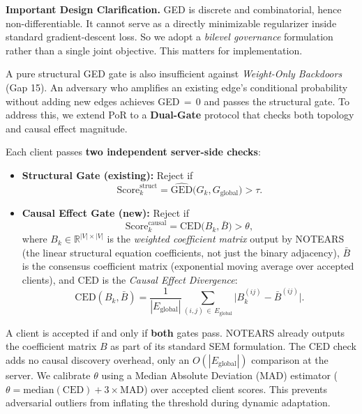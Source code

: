 \documentclass[journal]{IEEEtran}
\begin{document}
\textbf{Important Design Clarification.} GED is discrete and combinatorial, hence non-differentiable. It cannot serve as a directly minimizable regularizer inside standard gradient-descent loss. So we adopt a \emph{bilevel governance} formulation rather than a single joint objective. This matters for implementation.

A pure structural GED gate is also insufficient against \emph{Weight-Only Backdoors} (Gap 15). An adversary who amplifies an existing edge's conditional probability without adding new edges achieves GED\,$=$\,0 and passes the structural gate. To address this, we extend PoR to a \textbf{Dual-Gate} protocol that checks both topology and causal effect magnitude.

Each client passes \textbf{two independent server-side checks}:
\begin{itemize}
 \item \textbf{Structural Gate (existing):} Reject if
 \[
 \text{Score}_k^{\text{struct}} = \widehat{\text{GED}}\bigl(G_k, G_{\text{global}}\bigr) > \tau. \]
 \item \textbf{Causal Effect Gate (new):} Reject if
 \[
 \text{Score}_k^{\text{causal}} = \text{CED}\bigl(B_k, \bar{B}\bigr) > \theta,
 \]
 where $B_k \in \mathbb{R}^{|V| \times |V|}$ is the \emph{weighted coefficient matrix} output by NOTEARS (the linear structural equation coefficients, not just the binary adjacency), $\bar{B}$ is the consensus coefficient matrix (exponential moving average over accepted clients), and $\text{CED}$ is the \emph{Causal Effect Divergence}:
 \[
 \text{CED}(B_k, \bar{B})
 = \frac{1}{|E_{\text{global}}|}
 \sum_{(i,j)\,\in\, E_{\text{global}}}
 \bigl|B_k^{(ij)} - \bar{B}^{(ij)}\bigr|. \]
\end{itemize}

A client is accepted if and only if \textbf{both} gates pass. NOTEARS already outputs the coefficient matrix $B$ as part of its standard SEM formulation. The CED check adds no causal discovery overhead, only an $O(|E_{\text{global}}|)$ comparison at the server. We calibrate $\theta$ using a Median Absolute Deviation (MAD) estimator ($\theta = \text{median}(\text{CED}) + 3 \times \text{MAD}$) over accepted client scores. This prevents adversarial outliers from inflating the threshold during dynamic adaptation.
\end{document}
